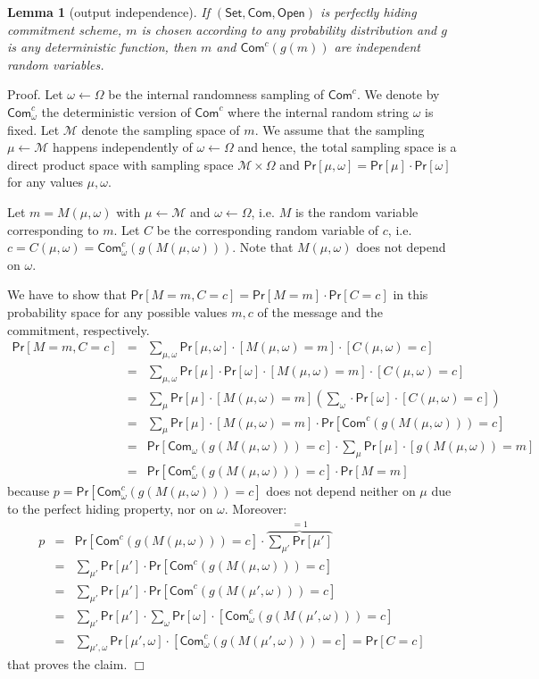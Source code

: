 \documentclass{article}
\newtheorem{lemma}{Lemma}[section]
\newenvironment{proof}{\textsf{Proof}.}{\hfill$\Box$}
\newcommand{\setup}[0]{\mathsf{Set}}
\newcommand{\commit}[0]{\mathsf{Com}}
\newcommand{\open}[0]{\mathsf{Open}}
\newcommand{\commitc}[0]{\mathsf{Com}^{c}}
\newcommand{\prob}[0]{\mathsf{Pr}} %
\begin{document}
\begin{lemma}[output independence]\label{le:outputindependence}
If $(\setup, \commit, \open)$ is perfectly hiding commitment scheme, $m$ is chosen according to any probability distribution and $g$ is any deterministic function, then $m$ and $\commitc(g(m))$ are independent random variables.
\end{lemma}
\begin{proof}
Let $\omega \gets \Omega$ be the internal randomness sampling of $\commitc$. We denote by $\commitc_\omega$ the deterministic version of $\commitc$ where the internal random string $\omega$ is fixed. Let $\mathcal{M}$ denote the sampling space of $m$. We assume that the sampling $\mu\gets \mathcal{M}$ happens independently of $\omega \gets \Omega$ and hence, the total sampling space is a direct product space with sampling space $\mathcal{M}\times \Omega$ and $\prob[\mu,\omega]=\prob[\mu]\cdot \prob[\omega]$ for any values $\mu, \omega$.

Let $m=M(\mu,\omega)$ with $\mu\gets \mathcal{M}$ and $\omega\gets \Omega$, i.e. $M$ is the random variable corresponding to $m$. Let $C$ be the corresponding random variable of $c$, i.e. $c=C(\mu,\omega)=\commitc_\omega(g(M(\mu,\omega)))$. Note that $M(\mu,\omega)$ does not depend on $\omega$.

We have to show that $\prob[M=m,C=c] = \prob[M=m]\cdot \prob[C=c]$ in this probability space for any possible values $m,c$ of the message and the commitment, respectively.
\begin{eqnarray*}
\prob[M=m,C=c] &=& \sum_{\mu,\omega}\prob[\mu,\omega]\cdot [M(\mu,\omega)=m]\cdot [C(\mu,\omega)=c]\\
&=& \sum_{\mu,\omega}\prob[\mu]\cdot\prob[\omega]\cdot [M(\mu,\omega)=m]\cdot [C(\mu,\omega)=c]\\
&=& \sum_{\mu}\prob[\mu]\cdot[M(\mu,\omega)=m]\left(\sum_{\omega}\cdot\prob[\omega]\cdot [C(\mu,\omega)=c]\right)\\
&=& \sum_{\mu}\prob[\mu]\cdot[M(\mu,\omega)=m]\cdot
\prob[\commitc(g(M(\mu,\omega)))=c]\\
&=& \prob[\commit_\omega(g(M(\mu,\omega)))=c]\cdot \sum_{\mu}\prob[\mu]\cdot[g(M(\mu,\omega))=m]\\
&=& \prob[\commitc_\omega(g(M(\mu,\omega)))=c]\cdot \prob[M=m]
\end{eqnarray*}
because $p = \prob[\commitc_\omega(g(M(\mu,\omega)))=c]$ does not depend neither on $\mu$ due to the perfect hiding property, nor on $\omega$. Moreover:
\begin{eqnarray*}
p &=& \prob[\commitc(g(M(\mu,\omega)))=c] \cdot \overbrace{\sum_{\mu'} \prob[\mu']}^{=1}\\
&=& \sum_{\mu'} \prob[\mu']\cdot \prob[\commitc(g(M(\mu,\omega)))=c]\\
&=& \sum_{\mu'} \prob[\mu']\cdot \prob[\commitc(g(M(\mu',\omega)))=c]\\
&=& \sum_{\mu'} \prob[\mu']\cdot \sum_{\omega}\prob[\omega]\cdot [\commitc_\omega(g(M(\mu',\omega)))=c]\\
&=& \sum_{\mu',\omega} \prob[\mu',\omega]\cdot [\commitc_\omega(g(M(\mu',\omega)))=c] = \prob[C=c]
\end{eqnarray*}
that proves the claim.
\end{proof}
\end{document}
